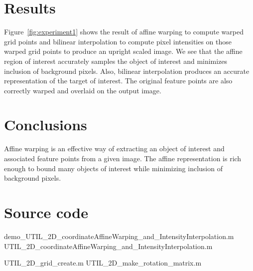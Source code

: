 \section{Results}
Figure~\ref{fig:experiment1} shows the result of affine warping to compute warped grid points and bilinear interpolation to compute pixel intensities on those warped grid points to produce an upright scaled image.  We see that the affine region of interest accurately samples the object of interest and minimizes inclusion of background pixels.  Also, bilinear interpolation produces an accurate representation of the target of interest.  The original feature points are also correctly warped and overlaid on the output image.

\section{Conclusions}
Affine warping is an effective way of extracting an object of interest and associated feature points from a given image.  The affine representation is rich enough to bound many objects of interest while minimizing inclusion of background pixels.




\newpage
\appendix
\section{Source code}
\label{Sec:sourceCode}
\scriptsize

			{demo_UTIL_2D_coordinateAffineWarping_and_IntensityInterpolation.m}
			{UTIL_2D_coordinateAffineWarping_and_IntensityInterpolation.m}


\newpage
							{UTIL_2D_grid_create.m}
					{UTIL_2D_make_rotation_matrix.m}


